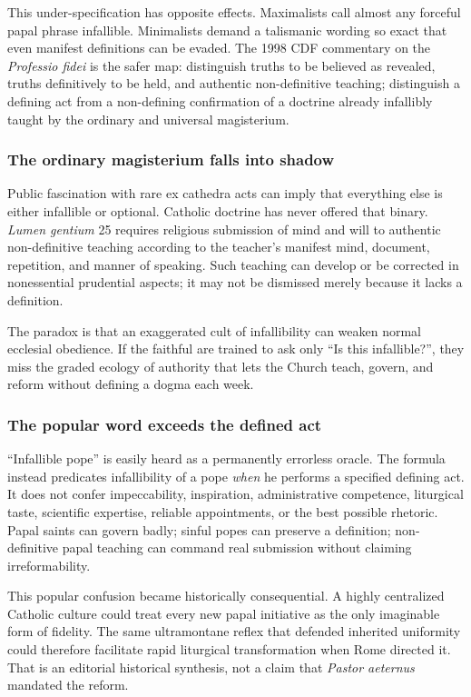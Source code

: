 This under-specification has opposite effects. Maximalists call almost any forceful papal phrase infallible. Minimalists demand a talismanic wording so exact that even manifest definitions can be evaded. The 1998 CDF commentary on the \emph{Professio fidei} is the safer map: distinguish truths to be believed as revealed, truths definitively to be held, and authentic non-definitive teaching; distinguish a defining act from a non-defining confirmation of a doctrine already infallibly taught by the ordinary and universal magisterium.

\subsubsection{The ordinary magisterium falls into shadow}

Public fascination with rare ex cathedra acts can imply that everything else is either infallible or optional. Catholic doctrine has never offered that binary. \emph{Lumen gentium} 25 requires religious submission of mind and will to authentic non-definitive teaching according to the teacher's manifest mind, document, repetition, and manner of speaking. Such teaching can develop or be corrected in nonessential prudential aspects; it may not be dismissed merely because it lacks a definition.

The paradox is that an exaggerated cult of infallibility can weaken normal ecclesial obedience. If the faithful are trained to ask only “Is this infallible?”, they miss the graded ecology of authority that lets the Church teach, govern, and reform without defining a dogma each week.

\subsubsection{The popular word exceeds the defined act}

“Infallible pope” is easily heard as a permanently errorless oracle. The formula instead predicates infallibility of a pope \emph{when} he performs a specified defining act. It does not confer impeccability, inspiration, administrative competence, liturgical taste, scientific expertise, reliable appointments, or the best possible rhetoric. Papal saints can govern badly; sinful popes can preserve a definition; non-definitive papal teaching can command real submission without claiming irreformability.

This popular confusion became historically consequential. A highly centralized Catholic culture could treat every new papal initiative as the only imaginable form of fidelity. The same ultramontane reflex that defended inherited uniformity could therefore facilitate rapid liturgical transformation when Rome directed it. That is an editorial historical synthesis, not a claim that \emph{Pastor aeternus} mandated the reform.

